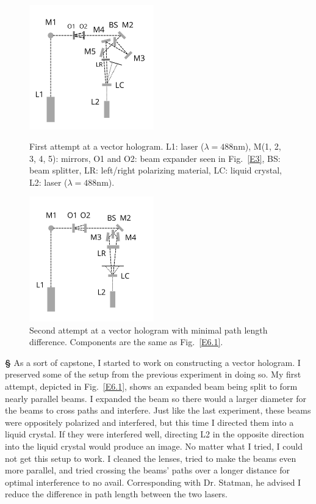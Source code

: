 \documentclass[12pt]{article}
\begin{document}
\newpage
\noindent
\begin{figure}
  \begin{center}
    \includegraphics[width=0.48\textwidth]{E6.1}
  \end{center}
  \caption{First attempt at a vector hologram. L1: laser ($\lambda=488$nm), M(1, 2, 3, 4, 5): mirrors, O1 and O2: beam expander seen in Fig.~\ref{E3}, BS: beam splitter, LR: left/right polarizing material, LC: liquid crystal, L2: laser ($\lambda=488$nm).}\label{E6.1}
  \begin{center}
    \includegraphics[width=0.48\textwidth]{E6.2}
  \end{center}
  \caption{Second attempt at a vector hologram with minimal path length difference. Components are the same as Fig.~\ref{E6.1}.}\label{E6.2}
\end{figure}
\large{\textbf{\S}}
As a sort of capstone, I started to work on constructing a vector hologram. I preserved some of the setup from the previous experiment in doing so. My first attempt, depicted in Fig.~\ref{E6.1}, shows an expanded beam being split to form nearly parallel beams. I expanded the beam so there would a larger diameter for the beams to cross paths and interfere. Just like the last experiment, these beams were oppositely polarized and interfered, but this time I directed them into a liquid crystal. If they were interfered well, directing L2 in the opposite direction into the liquid crystal would produce an image. No matter what I tried, I could not get this setup to work. I cleaned the lenses, tried to make the beams even more parallel, and tried crossing the beams' paths over a longer distance for optimal interference to no avail. Corresponding with Dr. Statman, he advised I reduce the difference in path length between the two lasers.
\end{document}
